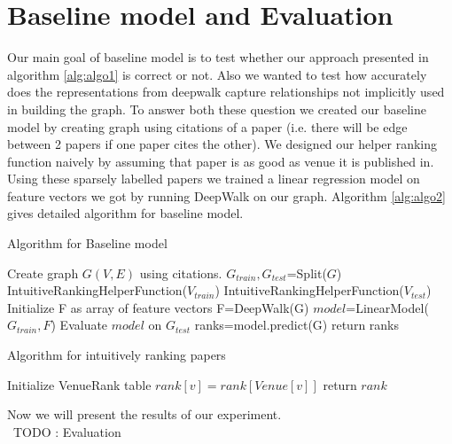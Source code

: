 \documentclass[a4paper, 11pt]{article}
\begin{document}
\section{Baseline model and Evaluation}
Our main goal of baseline model is to test whether our approach presented in algorithm \ref{alg:algo1} is correct or not. Also we wanted to test how accurately does the representations from deepwalk capture relationships not implicitly used in building the graph. To answer both these question we created our baseline model by creating graph using citations of a paper (i.e. there will be edge between 2 papers if one paper cites the other). We designed our helper ranking function naively by assuming that paper is as good as venue it is published in. Using these sparsely labelled papers we trained a linear regression model on feature vectors we got by running DeepWalk on our graph. Algorithm \ref{alg:algo2} gives detailed algorithm for baseline model.
\begin{algorithm}
\caption{Algorithm for Baseline model}
\label{alg:algo2}
\begin{algorithmic}[1]
\State Create graph $G(V,E)$ using citations.
\State $G_{train}, G_{test}$=Split($G$) 
\State IntuitiveRankingHelperFunction($V_{train}$)
\State IntuitiveRankingHelperFunction($V_{test}$)
\State Initialize F as array of feature vectors
\State F=DeepWalk(G) 
\State $model$=LinearModel($G_{train},F$)
\State Evaluate  $model$ on $G_{test}$
\State ranks=model.predict(G)
\State return ranks
\end{algorithmic}
\end{algorithm}
\begin{algorithm}
\caption{Algorithm for intuitively ranking papers}
\label{alg:algo3}
\begin{algorithmic}[1]
\State Initialize VenueRank table 
	\State $rank[v]=rank[Venue[v]]$ 
\EndFor
\State return $rank$
\EndProcedure
\end{algorithmic}
\end{algorithm}

Now we will present the results of our experiment. 
\\\ TODO : Evaluation
\end{document}

